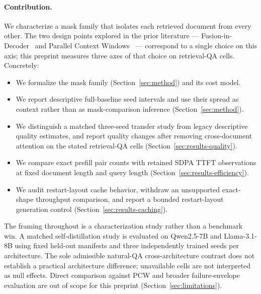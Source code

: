 \paragraph{Contribution.}
We characterize a mask family that isolates each retrieved document from
every other. The two design points explored in the prior literature ---
Fusion-in-Decoder~\citep{izacard2021fid} and Parallel Context
Windows~\citep{ratner2023pcw} --- correspond to a single choice on this axis;
this preprint measures three axes of that choice on retrieval-QA
cells. Concretely:
\begin{itemize}
    \item We formalize the mask family (Section~\ref{sec:method}) and its
          cost model.
    \item We report descriptive full-baseline seed intervals and use their
          spread as context rather than as mask-comparison inference
          (Section~\ref{sec:method}).
    \item We distinguish a matched three-seed transfer study from legacy
          descriptive quality estimates, and report quality changes after
          removing cross-document attention on the stated retrieval-QA cells
          (Section~\ref{sec:results-quality}).
    \item We compare exact prefill pair counts with retained SDPA TTFT
          observations at fixed document length and query length
          (Section~\ref{sec:results-efficiency}).
    \item We audit restart-layout cache behavior, withdraw an unsupported
          exact-shape throughput comparison, and report a bounded
          restart-layout generation control (Section~\ref{sec:results-caching}).
\end{itemize}
The framing throughout is a characterization study rather than a benchmark
win. A matched self-distillation study is evaluated on Qwen2.5-7B and
Llama-3.1-8B using fixed held-out manifests and three independently trained
seeds per architecture. The sole admissible natural-QA
cross-architecture contrast does not establish a practical architecture
difference; unavailable cells are not interpreted as null effects. Direct comparison against PCW and
broader failure-envelope evaluation are out of scope for this preprint
(Section~\ref{sec:limitations}).
